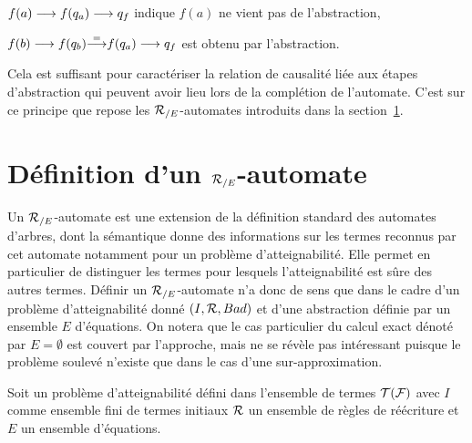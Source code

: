   \begin{example}
    \begin{description}
    \item $f(a) \longrightarrow f(q_a) \longrightarrow q_f$ indique $f(a)$ ne vient pas de l'abstraction,

    \item $f(b) \longrightarrow f(q_b) \mathbf{\stackrel{=}{\longrightarrow}} f(q_a) \longrightarrow q_f$ est obtenu par l'abstraction.
    \end{description}
  \end{example}
  
  Cela est suffisant pour caractériser la relation de causalité liée
  aux étapes d'abstraction qui peuvent avoir lieu lors de la
  complétion de l'automate.  C'est sur ce principe que repose les
  ${\mathcal R_{/E}}$-automates introduits dans la section~\ref{sec:RE-automaton}.



\section{Définition d'un ${\mathcal R_{/E}}$-automate}
\label{sec:RE-automaton}

Un ${\mathcal R_{/E}}$-automate est une extension de la définition standard des automates d'arbres,
dont la sémantique donne des informations sur les termes reconnus par cet automate
notamment pour un problème d'atteignabilité. Elle permet en particulier 
de distinguer les termes pour lesquels l'atteignabilité est sûre des autres termes.
Définir un ${\mathcal R_{/E}}$-automate n'a donc de sens que dans le cadre d'un problème d'atteignabilité 
donné $(I, \mathcal R, Bad)$ et d'une abstraction définie par un ensemble $E$ d'équations. 
On notera que le cas particulier du calcul exact
dénoté par $E = \emptyset$ est couvert par l'approche, mais ne se révèle pas intéressant puisque
le problème soulevé n'existe que dans le cas d'une sur-approximation.

Soit un problème d'atteignabilité défini dans l'ensemble de termes $\mathcal{T(F)}$ avec 
$I$ comme ensemble fini de termes initiaux $\mathcal R$ un ensemble de règles de réécriture
et $E$ un ensemble d'équations.




